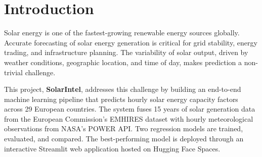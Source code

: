 \documentclass[12pt, a4paper]{article}
\begin{document}
\begin{abstract}
\noindent
Accurate forecasting of solar energy generation is essential for grid balancing, energy market operations, and renewable infrastructure planning across Europe. This report presents \textbf{SolarIntel}, an end-to-end machine learning system that predicts hourly solar capacity factors for 29 European countries by fusing 15 years of photovoltaic generation data from the European Commission's EMHIRES dataset with satellite-derived meteorological observations from NASA's POWER API. The resulting dataset comprises approximately 3.8 million hourly records and 34 features. Two regression models are trained and evaluated: a Linear Regression baseline ($R^2 = 0.7880$) and a Random Forest Regressor ($R^2 = 0.9112$). The superior model is deployed through an interactive Streamlit web application hosted on Hugging Face Spaces, enabling real-time prediction, 24-hour generation profiling, and cross-country comparison. Building on this ML foundation, Phase~2 introduces an Agentic AI Grid Advisor: a LangGraph-based multi-agent pipeline that fetches live weather forecasts, performs deterministic risk analysis, retrieves expert knowledge via Retrieval-Augmented Generation (RAG), and generates structured LLM recommendations tailored to grid operators and transmission system planners.
\end{abstract}

\clearpage
{}

\section{Introduction}

Solar energy is one of the fastest-growing renewable energy sources globally. Accurate forecasting of solar energy generation is critical for grid stability, energy trading, and infrastructure planning. The variability of solar output, driven by weather conditions, geographic location, and time of day, makes prediction a non-trivial challenge.

This project, \textbf{SolarIntel}, addresses this challenge by building an end-to-end machine learning pipeline that predicts hourly solar energy capacity factors across 29 European countries. The system fuses 15 years of solar generation data from the European Commission's EMHIRES dataset with hourly meteorological observations from NASA's POWER API. Two regression models are trained, evaluated, and compared. The best-performing model is deployed through an interactive Streamlit web application hosted on Hugging Face Spaces.
\end{document}

